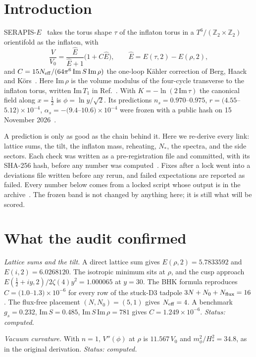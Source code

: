 \documentclass[aps,prd,twocolumn,superscriptaddress,nofootinbib,showkeys]{revtex4-2}
\begin{document}
\section{Introduction}
SERAPIS-$E$~\cite{P3} takes the torus shape $\tau$ of the inflaton torus in a $T^6/(\mathbb{Z}_2\times\mathbb{Z}_2)$ orientifold as the inflaton, with
\begin{equation}
\frac{V}{V_0}=\frac{\hat E}{\hat E+1}\bigl(1+C\hat E\bigr),\qquad \hat E=E(\tau,2)-E(\rho,2),
\label{eq:V}
\end{equation}
and $C=15N_{\rm eff}/(64\pi^6\,\mathrm{Im}\,S\,\mathrm{Im}\,\rho)$ the one-loop K\"ahler correction of Berg, Haack and K\"ors~\cite{BHK}. Here $\mathrm{Im}\,\rho$ is the volume modulus of the four-cycle transverse to the inflaton torus, written $\mathrm{Im}\,T_1$ in Ref.~\cite{P3}. With $K=-\ln(2\,\mathrm{Im}\,\tau)$ the canonical field along $x=\tfrac12$ is $\phi=\ln y/\sqrt2$. Its predictions $n_s=0.970$--$0.975$, $r=(4.55$--$5.12)\times10^{-4}$, $\alpha_s=-(9.4$--$10.6)\times10^{-4}$ were frozen with a public hash on 15 November 2026~\cite{SERAPIS}.

A prediction is only as good as the chain behind it. Here we re-derive every link: lattice sums, the tilt, the inflaton mass, reheating, $N_*$, the spectra, and the side sectors. Each check was written as a pre-registration file and committed, with its SHA-256 hash, before any number was computed~\cite{P4}. Fixes after a lock went into a deviations file written before any rerun, and failed expectations are reported as failed. Every number below comes from a locked script whose output is in the archive~\cite{AEGIS}. The frozen band is not changed by anything here; it is still what will be scored.

\section{What the audit confirmed}
\emph{Lattice sums and the tilt.} A direct lattice sum gives $E(\rho,2)=5.7833592$ and $E(i,2)=6.0268120$. The isotropic minimum sits at $\rho$, and the cusp approach $E(\tfrac12+iy,2)/2\zeta(4)y^2=1.000065$ at $y=30$. The BHK formula reproduces $C=(1.0$--$1.3)\times10^{-6}$ for every row of the stuck-D3 tadpole $3N+N_0+N_{\rm flux}=16$. The flux-free placement $(N,N_0)=(5,1)$ gives $N_{\rm eff}=4$. A benchmark $g_s=0.232$, $\mathrm{Im}\,S=0.485$, $\mathrm{Im}\,S\,\mathrm{Im}\,\rho=781$ gives $C=1.249\times10^{-6}$. \emph{Status: computed.}

\emph{Vacuum curvature.} With $n=1$, $V''(\phi)$ at $\rho$ is $11.567\,V_0$ and $m_\phi^2/H_*^2=34.8$, as in the original derivation. \emph{Status: computed.}
\end{document}
